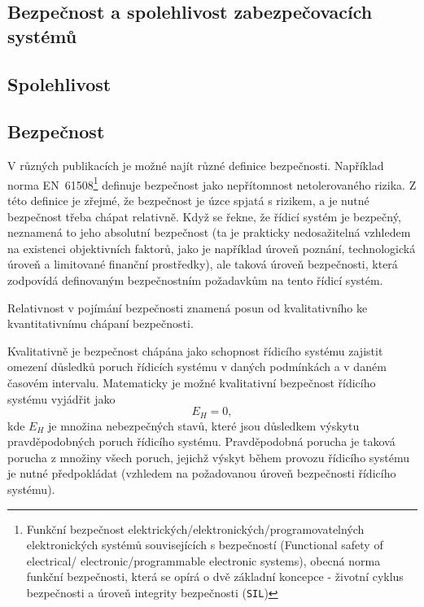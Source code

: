 \begin{center}
\printbibliography[title={Seznam literatury}, heading=subbibliography]

\chapter{Bezpečnost a spolehlivost zabezpečovacích systémů}
  \section{Spolehlivost}
  \section{Bezpečnost}
    V různých publikacích je možné najít různé definice bezpečnosti. Například norma 
    EN~61508\footnote{Funkční bezpečnost elektrických/elektronických/programovatelných 
    elektronických systémů souvisejících s bezpečností (Functional safety of electrical/ 
    electronic/programmable electronic systems), obecná norma funkční bezpečnosti, která se opírá o 
    dvě základní koncepce - životní cyklus bezpečnosti a úroveň integrity bezpečnosti 
    (\texttt{SIL})} definuje bezpečnost jako nepřítomnost netolerovaného rizika. Z této definice je 
    zřejmé, že bezpečnost je úzce spjatá s rizikem, a je nutné bezpečnost třeba chápat relativně. 
    Když se řekne, že řídicí systém je bezpečný, neznamená to jeho absolutní bezpečnost (ta je 
    prakticky nedosažitelná vzhledem na existenci objektivních faktorů, jako je například úroveň 
    poznání, technologická úroveň a limitované finanční prostředky), ale taková úroveň bezpečnosti, 
    která zodpovídá definovaným bezpečnostním požadavkům na tento řídicí systém. 

    Relativnost v pojímání bezpečnosti znamená posun od kvalitativního ke kvantitativnímu chápaní bezpečnosti.

    Kvalitativně je bezpečnost chápána jako schopnost řídicího systému zajistit omezení důsledků 
    poruch řídicích systému v daných podmínkách a v daném časovém intervalu. Matematicky je možné 
    kvalitativní bezpečnost řídicího systému vyjádřit jako 
    \begin{equation}
      E_H = 0,
    \end{equation}
    kde \(E_H\) je množina nebezpečných stavů, které jsou důsledkem výskytu pravděpodobných poruch 
    řídicího systému. Pravděpodobná porucha je taková porucha z množiny všech poruch, jejichž 
    výskyt během provozu řídicího systému je nutné předpokládat (vzhledem na požadovanou úroveň 
    bezpečnosti řídicího systému).
	

\end{center}

